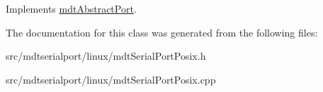 Implements \hyperlink{classmdt_abstract_port_a64d4802975a76474b9196c91f57a6d90}{mdtAbstractPort}.



The documentation for this class was generated from the following files:\begin{DoxyCompactItemize}
\item 
src/mdtserialport/linux/mdtSerialPortPosix.h\item 
src/mdtserialport/linux/mdtSerialPortPosix.cpp\end{DoxyCompactItemize}
